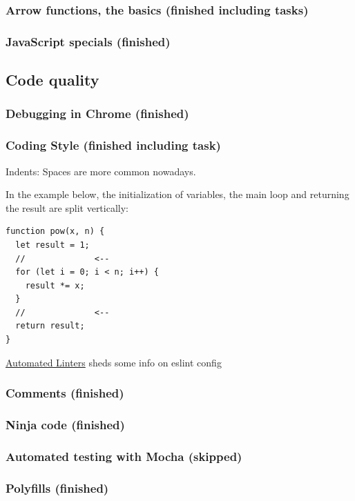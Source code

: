 \documentclass[a4paper, 12pt]{article}
\begin{document}
\subsubsection{Arrow functions, the basics (finished including tasks)}

\subsubsection{JavaScript specials (finished)}

\subsection{Code quality}
\subsubsection{Debugging in Chrome (finished)}

\subsubsection{Coding Style (finished including task)}
Indents: Spaces are more common nowadays.

In the example below, the initialization of variables, the main loop and returning the result are split vertically:
\begin{verbatim}
function pow(x, n) {
  let result = 1;
  //              <--
  for (let i = 0; i < n; i++) {
    result *= x;
  }
  //              <--
  return result;
}
\end{verbatim}

\href{https://javascript.info/coding-style#automated-linters}{Automated Linters} sheds some info on eslint config

\subsubsection{Comments (finished)}

\subsubsection{Ninja code (finished)}

\subsubsection{Automated testing with Mocha (skipped)}

\subsubsection{Polyfills (finished)}
\end{document}
